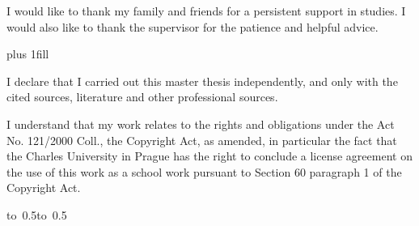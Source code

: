 \documentclass[12pt,a4paper]{report}
\let\openright=\clearpage
\begin{document}
\openright

\noindent
I would like to thank my family and friends for a persistent support in studies. I would also like to thank the supervisor for the patience and helpful advice.

\newpage


\vglue 0pt plus 1fill

\noindent
I declare that I carried out this master thesis independently, and only with the cited
sources, literature and other professional sources.

\medskip\noindent
I understand that my work relates to the rights and obligations under the Act No.
121/2000 Coll., the Copyright Act, as amended, in particular the fact that the Charles
University in Prague has the right to conclude a license agreement on the use of this
work as a school work pursuant to Section 60 paragraph 1 of the Copyright Act.

\vspace{10mm}

\hbox{\hbox to 0.5\hbox to 0.5}

\vspace{20mm}
\newpage

\end{document}

